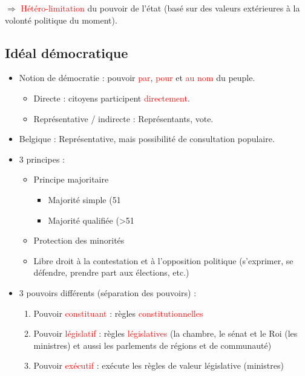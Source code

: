 $\Rightarrow$ \textcolor{red}{Hétéro-limitation} du pouvoir de l'état (basé sur des valeurs extérieures à la volonté politique du moment).

\subsection{Idéal démocratique}

\begin{itemize}
    \item Notion de démocratie : pouvoir \textcolor{red}{par}, \textcolor{red}{pour} et \textcolor{red}{au nom} du peuple.
    \begin{itemize}
        \item Directe : citoyens participent \textcolor{red}{directement}.
        \item Représentative / indirecte : Représentants, vote.
    \end{itemize}
    \item Belgique : Représentative, mais possibilité de consultation populaire.
    \item 3 principes :
    \begin{itemize}
        \item Principe majoritaire
        \begin{itemize}
            \item Majorité simple (51%
            \item Majorité qualifiée (>51%
        \end{itemize}
        \item Protection des minorités
        \item Libre droit à la contestation et à l'opposition politique (s'exprimer, se défendre, prendre part aux élections, etc.)
    \end{itemize}
    \item 3 pouvoirs différents (séparation des pouvoirs) :
    \begin{enumerate}
        \item Pouvoir \textcolor{red}{constituant} : règles \textcolor{red}{constitutionnelles}
        \item Pouvoir \textcolor{red}{législatif} : règles \textcolor{red}{législatives} (la chambre, le sénat et le Roi (les ministres) et aussi les parlements de régions et de communauté)
        \item Pouvoir \textcolor{red}{exécutif} : exécute les règles de valeur législative (ministres)\\

\end{enumerate}
\end{itemize}
